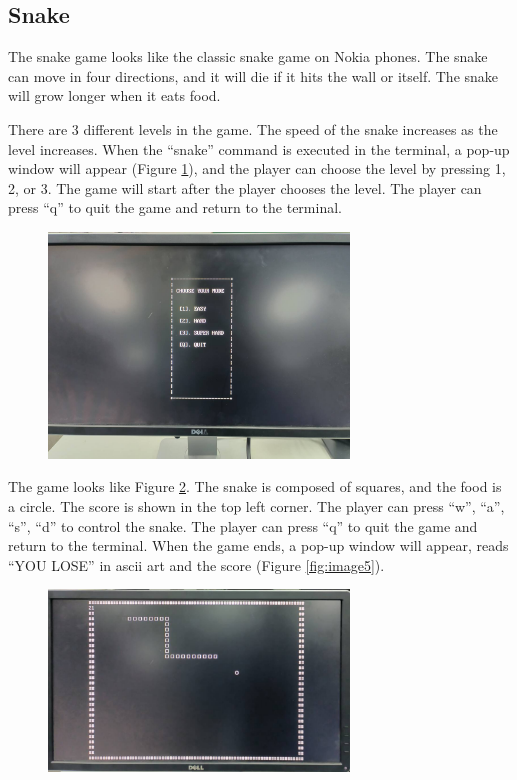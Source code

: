 \documentclass[
	a4paper, %
	11pt, %
]{CSUniSchoolLabReport}
\begin{document}
\subsection{Snake}
The snake game looks like the classic snake game on Nokia phones. The snake can move in four directions, and it will die if it hits the wall or itself. The snake will grow longer when it eats food.

There are 3 different levels in the game. The speed of the snake increases as the level increases. When the ``snake'' command is executed in the terminal, a pop-up window will appear (Figure \ref{fig:image3}), and the player can choose the level by pressing 1, 2, or 3. The game will start after the player chooses the level. The player can press ``q'' to quit the game and return to the terminal.

\begin{figure}[!htb]
    \centering
    \includegraphics[width=8cm]{image3.png}
    \label{fig:image3}
\end{figure}
The game looks like Figure \ref{fig:image4}. The snake is composed of squares, and the food is a circle. The score is shown in the top left corner. The player can press ``w'', ``a'', ``s'', ``d'' to control the snake. The player can press ``q'' to quit the game and return to the terminal. When the game ends, a pop-up window will appear, reads ``YOU LOSE'' in ascii art and the score (Figure \ref{fig:image5}).

\begin{figure}[!htb]
    \centering
    \includegraphics[width=8cm]{image4.png}
    \label{fig:image4}
\end{figure}
\end{document}
